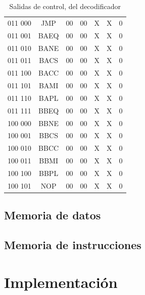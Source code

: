 \documentclass[paper=letter, fontsize=12pt]{article}
\begin{document}
\begin{table}
\begin{tabular}{cc|ccccc}
011 000 	& JMP			& 00 	& 00    & X     & X     & 0 \\
011 001 	& BAEQ			& 00 	& 00    & X     & X     & 0 \\
011 010 	& BANE			& 00 	& 00    & X     & X     & 0 \\
011 011 	& BACS			& 00 	& 00    & X     & X     & 0 \\
011 100 	& BACC			& 00 	& 00    & X     & X     & 0 \\
011 101 	& BAMI			& 00 	& 00    & X     & X     & 0 \\
011 110 	& BAPL			& 00 	& 00    & X     & X     & 0 \\
011 111 	& BBEQ			& 00 	& 00    & X     & X     & 0 \\
100 000 	& BBNE			& 00 	& 00    & X     & X     & 0 \\
100 001 	& BBCS			& 00 	& 00    & X     & X     & 0 \\
100 010 	& BBCC			& 00 	& 00    & X     & X     & 0 \\
100 011 	& BBMI			& 00 	& 00    & X     & X     & 0 \\
100 100 	& BBPL			& 00 	& 00    & X     & X     & 0 \\

100 101 	& NOP			& 00 	& 00    & X     & X     & 0 \\

\end{tabular}
\caption{Salidas de control, del decodificador}
\label{tablaDecodificacion}
\end{table}


\subsection{Memoria de datos}

\subsection{Memoria de instrucciones}

\pagebreak
\section{Implementación}
\end{document}
